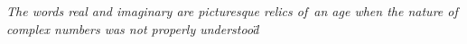 \documentclass[preview]{standalone}
\begin{document}
\begin{center}
\"\textit{The words real and imaginary are picturesque relics of\
        an age when the nature of complex numbers was not properly understood}\"
\end{center}
\end{document}
